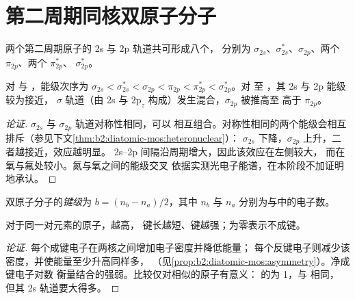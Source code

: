 \section{第二周期同核双原子分子}

两个第二周期原子的 2s 与 2p 轨道共可形成八个，
分别为 $\sigma_{2s}$、$\sigma^*_{2s}$、$\sigma_{2p}$、两个 $\pi_{2p}$、两个 $\pi^*_{2p}$、
$\sigma^*_{2p}$。

\begin{proposition}[s--p 混合]\label{prop:b2:diatomic-mos:sp-mixing}
对  与 ，能级次序为 $\sigma_{2s} < \sigma^*_{2s} < \sigma_{2p} < \pi_{2p} <
\pi^*_{2p} < \sigma^*_{2p}$。对  至 ，其 2s 与 2p 能级较为接近，
$\sigma$ 轨道（由 2s 与 $2\mathrm p_z$ 构成）发生混合，$\sigma_{2p}$ 被推高至
高于 $\pi_{2p}$。
\end{proposition}

\begin{proof}[论证]
$\sigma_{2s}$ 与 $\sigma_{2p}$ 轨道对称性相同，可以
相互组合。对称性相同的两个能级会相互排斥（参见下文\cref{thm:b2:diatomic-mos:heteronuclear}）：
$\sigma_{2s}$ 下降，$\sigma_{2p}$ 上升，二者越接近，效应越明显。
2s--2p 间隔沿周期增大，因此该效应在左侧较大，
而在氧与氟处较小。氮与氧之间的能级交叉
依据实测光电子能谱，在本阶段不加证明地承认。
\end{proof}

\begin{definition}[键级]\label{def:b2:diatomic-mos:bond-order}
双原子分子的\emph{键级}为 $b = (n_b -
n_a)/2$，其中 $n_b$ 与 $n_a$ 分别为与中的电子数。
\end{definition}

\begin{proposition}[键级与键]\label{prop:b2:diatomic-mos:bond-order}
对于同一对元素的原子，越高，
键长越短、键越强；为零表示不成键。
\end{proposition}

\begin{proof}[论证]
每个成键电子在两核之间增加电子密度并降低能量；
每个反键电子则减少该密度，并使能量至少升高同样多，
（见\cref{prop:b2:diatomic-mos:asymmetry}）。净成键电子对数
衡量结合的强弱。比较仅对相似的原子有意义： 的为 1，与  相同，
但其 2s 轨道要大得多。
\end{proof}

